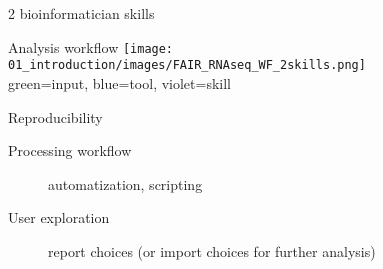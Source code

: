 \begin{frame}[label=RNAseqWF2skill_diapo]{2 bioinformatician skills}
\begin{block}{Analysis workflow}
    \texttt{[image: 01\_introduction/images/FAIR\_RNAseq\_WF\_2skills.png]}\\
green=input, blue=tool, violet=skill
\end{block}
\begin{block}{Reproducibility}
\begin{description}
    \item[Processing workflow] automatization, scripting
    \item[User exploration] report choices (or import choices for further analysis) 
\end{description}
\end{block}
\end{frame}